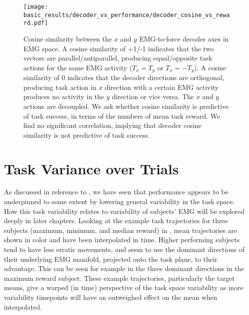 \documentclass[../main.tex]{subfiles}
\begin{document}

\begin{figure}[!htb]%
    \centering
    \texttt{[image: basic\_results/decoder\_vs\_performance/decoder\_cosine\_vs\_reward.pdf]}
    \caption[Decoder cosine similarity versus reward]{Cosine similarity between the $x$ and $y$ EMG-to-force decoder axes in EMG space. A cosine similarity of +1/-1 indicates that the two vectors are parallel/antiparallel, producing equal/opposite task actions for the same EMG activity ($T_x = T_y$ or $T_x = -T_y$). A cosine similarity of 0 indicates that the decoder directions are orthogonal, producing task action in $x$ direction with a certain EMG activity produces no activity in the $y$ direction or vice versa. The $x$ and $y$ actions are decoupled. We ask whether cosine similarity is predictive of task success, in terms of the numbers of mean task reward. We find no significant correlation, implying that decoder cosine similarity is not predictive of task success.}\label{fig:decoder_cosine_vs_reward}
\end{figure}



\section{Task Variance over Trials}

As discussed in reference to , we have seen that performance appears to be underpinned to some extent by lowering general variability in the task space. How this task variability relates to variability of subjects' EMG will be explored deeply in later chapters. Looking at the example task trajectories for three subjects (maximum, minimum, and median reward) in , mean trajectories are shown in color and have been interpolated in time. Higher performing subjects tend to have less erratic movements, and seem to use the dominant directions of their underlying EMG manifold, projected onto the task plane, to their advantage. This can be seen for example in the three dominant directions in the maximum reward subject. These example trajectories, particularly the target means, give a warped (in time) perspective of the task space variability as more variability timepoints will have an outweighed effect on the mean when interpolated.
\end{document}
